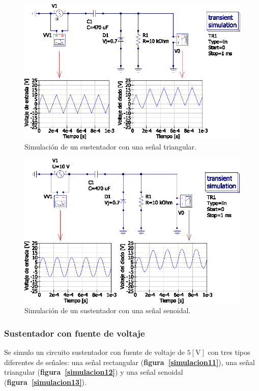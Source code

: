 \documentclass[letter,twoside,11pt]{article}
\begin{document}
\begin{figure}[!h]
\centering
\includegraphics[scale=0.97]{simulacion/practica1.9.eps}
\caption{Simulación de un sustentador con una señal triangular.}
\label{simulacion9}
\end{figure}

\begin{figure}[!h]
\centering
\includegraphics[scale=0.97]{simulacion/practica1.10.eps}
\caption{Simulación de un sustentador con una señal senoidal.}
\label{simulacion10}
\end{figure}

\subsubsection{Sustentador con fuente de voltaje}
Se simulo un circuito sustentador con fuente de voltaje de $5[\text{V}]$ con
tres tipos diferentes de señales: una señal rectangular
(\textbf{figura~\ref{simulacion11}}), una señal triangular
(\textbf{figura~\ref{simulacion12}}) y una señal senoidal
(\textbf{figura~\ref{simulacion13}}).
\end{document}
